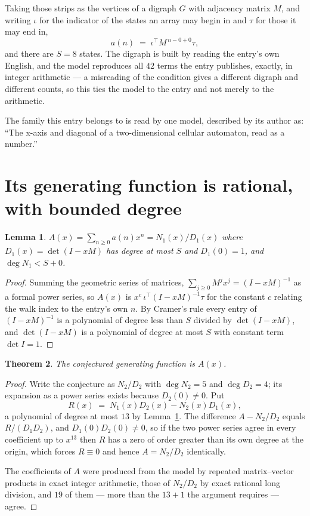 \documentclass[11pt,a4paper]{article}
\theoremstyle{plain}
\newtheorem{theorem}{Theorem}
\newtheorem{lemma}[theorem]{Lemma}
\theoremstyle{definition}
\begin{document}
Taking those strips as the vertices of a digraph $G$ with adjacency matrix $M$, and writing
$\iota$ for the indicator of the states an array may begin in and $\tau$ for those it may end
in,
\[
a(n)\;=\;\iota^{\!\top}M^{\,n-0+0}\tau ,
\]
and there are $S=8$ states. The digraph is built by reading the entry's own English, and the
model reproduces all $42$ terms the entry publishes, exactly, in integer arithmetic --- a
misreading of the condition gives a different digraph and different counts, so this ties the
model to the entry and not merely to the arithmetic.

The family this entry belongs to is read by one model, described by its author as: ``The x-axis and diagonal of a two-dimensional cellular automaton, read as a number.''


\section{Its generating function is rational, with bounded degree}

\begin{lemma}\label{lem:rat}
$A(x)=\sum_{n\ge0}a(n)x^n=N_1(x)/D_1(x)$ where $D_1(x)=\det(I-xM)$ has degree at most
$S$ and $D_1(0)=1$, and $\deg N_1<S+0$.
\end{lemma}

\begin{proof}
Summing the geometric series of matrices, $\sum_{j\ge0}M^jx^j=(I-xM)^{-1}$ as a formal
power series, so $A(x)$ is $x^{c}\,\iota^{\!\top}(I-xM)^{-1}\tau$ for the constant $c$
relating the walk index to the entry's own $n$. By Cramer's rule every entry of
$(I-xM)^{-1}$ is a polynomial of degree less than $S$ divided by $\det(I-xM)$, and
$\det(I-xM)$ is a polynomial of degree at most $S$ with constant term $\det I=1$.
\end{proof}

\begin{theorem}
The conjectured generating function is $A(x)$.
\end{theorem}

\begin{proof}
Write the conjecture as $N_2/D_2$ with $\deg N_2=5$ and $\deg D_2=4$; its expansion as a
power series exists because $D_2(0)\neq0$. Put
\[
R(x)\;=\;N_1(x)D_2(x)-N_2(x)D_1(x),
\]
a polynomial of degree at most $13$ by Lemma~\ref{lem:rat}. The difference
$A-N_2/D_2$ equals $R/(D_1D_2)$, and $D_1(0)D_2(0)\neq0$, so if the two power series agree in
every coefficient up to $x^{13}$ then $R$ has a zero of order greater than its own
degree at the origin, which forces $R\equiv0$ and hence $A=N_2/D_2$ identically.

The coefficients of $A$ were produced from the model by repeated matrix--vector products in
exact integer arithmetic, those of $N_2/D_2$ by exact rational long division, and $19$
of them --- more than the $13+1$ the argument requires --- agree.
\end{proof}
\end{document}
